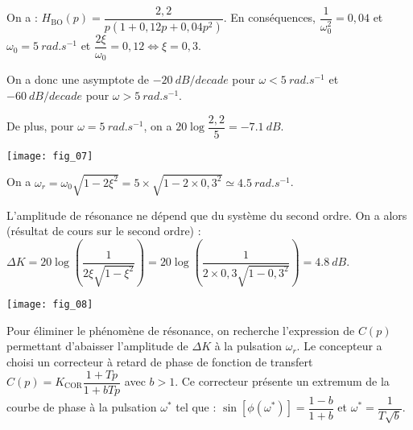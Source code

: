 \fi

\ifprof
\begin{corrige}
On a : $H_{\text{BO}}(p)=\dfrac{2,2}{p\left(1+0,12p + 0,04 p ^2  \right)}$. En conséquences, $\dfrac{1}{\omega_0^2}={0,04}$ et $\omega_0 = \SI{5}{rad.s^{-1}}$ et $\dfrac{2\xi}{\omega_0}=0,12 \Leftrightarrow \xi=0,3$.


On a donc une asymptote de $-\SI{20}{dB/decade}$ pour $\omega<\SI{5}{rad.s^{-1}}$ et $-\SI{60}{dB/decade}$ pour $\omega>\SI{5}{rad.s^{-1}}$.

De plus, pour $\omega=\SI{5}{rad.s^{-1}}$, on a $20\log\dfrac{2,2}{5}=\SI{-7,1}{dB}$. 

\end{corrige}
\else
\fi

\ifprof
\else
\begin{marginfigure}
\texttt{[image: fig\_07]}
\end{marginfigure}
\fi

\ifprof
\begin{corrige}
On a $\omega_r = \omega_0\sqrt{1-2\xi^2}=5\times \sqrt{1-2\times 0,3^2}\simeq \SI{4,5}{rad.s^{-1}}$.
\end{corrige}
\else
\fi


\ifprof
\begin{corrige}
L'amplitude de résonance ne dépend que du système du second ordre. On a alors (résultat de cours sur le second ordre) : 
$\Delta K = 20\log \left( \dfrac{1}{2\xi \sqrt{1-\xi^2}}\right)=20\log \left( \dfrac{1}{2\times 0,3 \sqrt{1-0,3^2}}\right)=\SI{4,8}{dB}$. 
\end{corrige}
\else
\fi

\ifprof
\else
\begin{marginfigure}
\texttt{[image: fig\_08]}
\end{marginfigure}
\fi

 \ifprof
 \else
Pour éliminer le phénomène de résonance, on recherche l’expression de $C(p)$ permettant d’abaisser
l’amplitude de $\Delta K$ à la pulsation $\omega_r$. Le concepteur a choisi un correcteur à retard de phase de fonction de
transfert $C(p)=K_{\text{COR}} \dfrac{1+Tp}{1+bTp}$ avec $b>1$. Ce correcteur présente un extremum de la courbe de phase à la pulsation $\omega^{*}$ tel que : $\sin\left[\phi\left(\omega^{*}\right)\right]=\dfrac{1-b}{1+b}$ et $\omega^{*}=\dfrac{1}{T\sqrt{b}}$.


